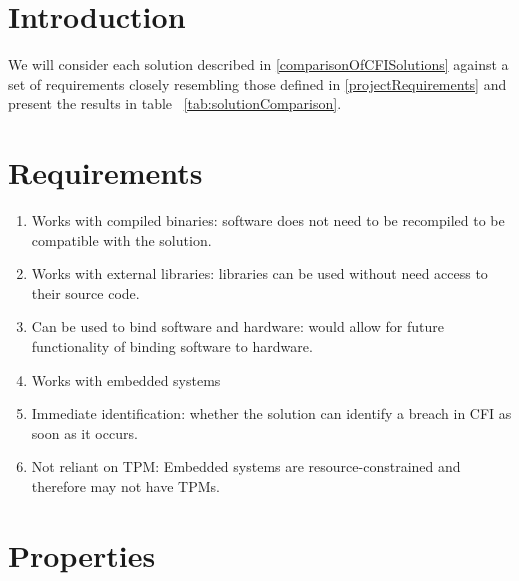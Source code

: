 \section{Introduction}\label{requirementsIntro}

We will consider each solution described in \ref{comparisonOfCFISolutions} against a set of requirements closely resembling those defined in \ref{projectRequirements} and present the results in table ~\ref{tab:solutionComparison}.

\section{Requirements}\label{Requirements}

\begin{enumerate}
	\item Works with compiled binaries: software does not need to be recompiled to be compatible with the solution.
	\item Works with external libraries: libraries can be used without need access to their source code.
	\item Can be used to bind software and hardware: would allow for future functionality of binding software to hardware.
	\item Works with embedded systems
	\item Immediate identification: whether the solution can identify a breach in CFI as soon as it occurs.
	\item Not reliant on TPM: Embedded systems are resource-constrained and therefore may not have TPMs.
\end{enumerate}

\section{Properties}\label{Properties}

